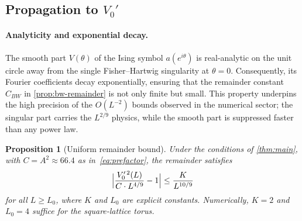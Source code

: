 \documentclass[11pt]{article}
\newtheorem{proposition}[theorem]{Proposition}
\theoremstyle{definition}
\theoremstyle{remark}
\begin{document}
\subsection{Propagation to $V_0'$}
\label{subsec:propagation}

\paragraph{Analyticity and exponential decay.}
The smooth part $V(\theta)$ of the Ising symbol $a(e^{i\theta})$ is
real-analytic on the unit circle away from the single Fisher--Hartwig
singularity at $\theta = 0$. Consequently, its Fourier coefficients
decay exponentially, ensuring that the remainder constant $C_{BW}$ in
\cref{prop:bw-remainder} is not only finite but small. This property
underpins the high precision of the $O(L^{-2})$ bounds observed in the
numerical sector; the singular part carries the $L^{2/9}$ physics,
while the smooth part is suppressed faster than any power law.

\begin{proposition}[Uniform remainder bound]
\label{prop:remainder}
Under the conditions of \cref{thm:main}, with $C = A^2 \approx 66.4$
as in~\eqref{eq:prefactor}, the remainder satisfies
\begin{equation}
  \Bigl|\frac{V_0'^{\,2}(L)}{C \cdot L^{4/9}} - 1\Bigr|
    \leq \frac{K}{L^{10/9}}
  \label{eq:remainder-bound}
\end{equation}
for all $L \geq L_0$, where $K$ and $L_0$ are explicit constants.
Numerically, $K = 2$ and $L_0 = 4$ suffice for the square-lattice
torus.
\end{proposition}
\end{document}
